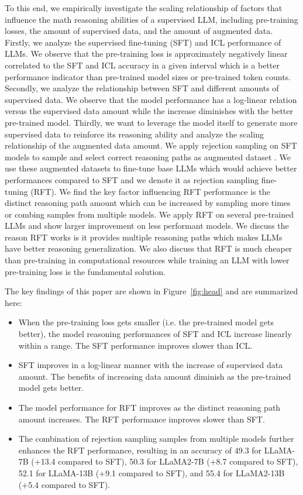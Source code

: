 \documentclass{article} \usepackage{iclr2021_conference,times}
\begin{document}
To this end, we empirically investigate the scaling relationship of factors that influence the math reasoning abilities of a supervised LLM, including pre-training losses, the amount of supervised data, and the amount of augmented data.
Firstly, we analyze the supervised fine-tuning (SFT) and ICL performance of LLMs.
We observe that the pre-training loss is approximately negatively linear correlated to the SFT and ICL accuracy in a given interval which is a better performance indicator than pre-trained model sizes or pre-trained token counts. 
Secondly, we analyze the relationship between SFT and different amounts of supervised data. 
We observe that the model performance has a log-linear relation versus the supervised data amount while the increase diminishes with the better pre-trained model. 
Thirdly, we want to leverage the model itself to generate more supervised data to reinforce its reasoning ability and analyze the scaling relationship of the augmented data amount.
We apply rejection sampling on SFT models to sample and select correct reasoning paths as augmented dataset \citep{uesato2022solving,zhu-etal-2023-solving}.
We use these augmented datasets to fine-tune base LLMs which would achieve better performances compared to SFT and we denote it as rejection sampling fine-tuning (RFT).
We find the key factor influencing RFT performance is the distinct reasoning path amount which can be increased by sampling more times or combing samples from multiple models.
We apply RFT on several pre-trained LLMs and show larger improvement on less performant models.
We discuss the reason RFT works is it provides multiple reasoning paths which makes LLMs have better reasoning generalization.
We also discuss that RFT is much cheaper than pre-training in computational resources while training an LLM with lower pre-training loss is the fundamental solution.

The key findings of this paper are shown in Figure~\ref{fig:head} and are summarized here:
\begin{itemize}
\item When the pre-training loss gets smaller (i.e. the pre-trained model gets better), the model reasoning performances of SFT and ICL increase linearly within a range. The SFT performance improves slower than ICL.
\item SFT improves in a log-linear manner with the increase of supervised data amount. The benefits of increasing data amount diminish as the pre-trained model gets better.
\item The model performance for RFT improves as the distinct reasoning path amount increases. The RFT performance improves slower than SFT.
\item The combination of rejection sampling samples from multiple models further enhances the RFT performance, resulting in an accuracy of 49.3 for LLaMA-7B (+13.4 compared to SFT), 50.3 for LLaMA2-7B (+8.7 compared to SFT), 52.1 for LLaMA-13B (+9.1 compared to SFT), and 55.4 for LLaMA2-13B (+5.4 compared to SFT).
\end{itemize}
\end{document}
